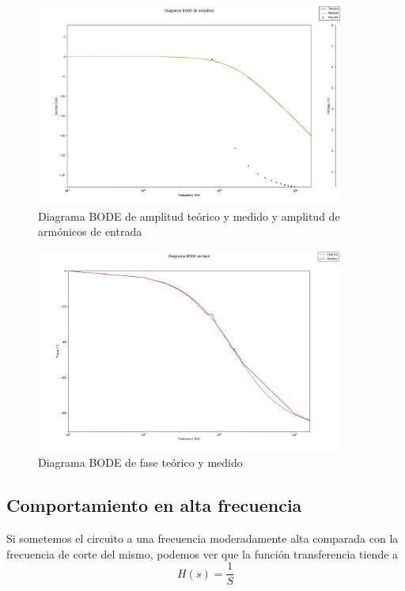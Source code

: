 \begin{figure}[H]
    \centering
    \includegraphics[width=0.9\textwidth]{./EJ2/EJ2_BODE_teorico.png}
    \caption{Diagrama BODE de amplitud te\'orico y medido y amplitud de arm\'onicos de entrada}
    \label{fig:bode_amp_superp_2} 
\end{figure}

\begin{figure}[H]
    \centering
    \includegraphics[width=0.9\textwidth]{./EJ2/EJ2_fase_BODE.png}
    \caption{Diagrama BODE de fase te\'orico y medido}
    \label{fig:bode_phase_superp_2} 
\end{figure}

\subsection{Comportamiento en alta frecuencia}

Si sometemos el circuito a una frecuencia moderadamente alta comparada con la frecuencia de corte del mismo, podemos ver que la funci\'on transferencia tiende a 
\begin{equation}\label{integrador_2}
    H(s)=\frac{1}{S}
\end{equation}

